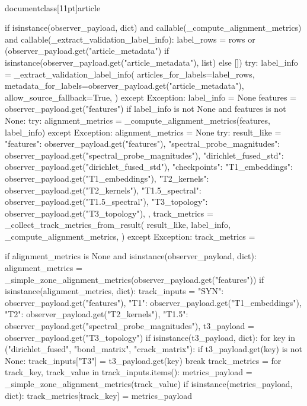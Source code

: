 \\documentclass[11pt]{article}
\begin{document}
\begin{CodeBlock}
    if isinstance(observer_payload, dict) and callable(_compute_alignment_metrics) and callable(_extract_validation_label_info):
        label_rows = rows or (observer_payload.get("article_metadata") if isinstance(observer_payload.get("article_metadata"), list) else [])
        try:
            label_info = _extract_validation_label_info(
                articles_for_labels=label_rows,
                metadata_for_labels=observer_payload.get("article_metadata"),
                allow_source_fallback=True,
            )
        except Exception:
            label_info = None
        features = observer_payload.get("features")
        if label_info is not None and features is not None:
            try:
                alignment_metrics = _compute_alignment_metrics(features, label_info)
            except Exception:
                alignment_metrics = None
            try:
                result_like = {
                    "features": observer_payload.get("features"),
                    "spectral_probe_magnitudes": observer_payload.get("spectral_probe_magnitudes"),
                    "dirichlet_fused_std": observer_payload.get("dirichlet_fused_std"),
                    "checkpoints": {
                        "T1_embeddings": observer_payload.get("T1_embeddings"),
                        "T2_kernels": observer_payload.get("T2_kernels"),
                        "T1.5_spectral": observer_payload.get("T1.5_spectral"),
                        "T3_topology": observer_payload.get("T3_topology"),
                    },
                }
                track_metrics = _collect_track_metrics_from_result(
                    result_like,
                    label_info,
                    _compute_alignment_metrics,
                )
            except Exception:
                track_metrics = {}

    if alignment_metrics is None and isinstance(observer_payload, dict):
        alignment_metrics = _simple_zone_alignment_metrics(observer_payload.get("features"))
        if isinstance(alignment_metrics, dict):
            track_inputs = {
                "SYN": observer_payload.get("features"),
                "T1": observer_payload.get("T1_embeddings"),
                "T2": observer_payload.get("T2_kernels"),
                "T1.5": observer_payload.get("spectral_probe_magnitudes"),
            }
            t3_payload = observer_payload.get("T3_topology")
            if isinstance(t3_payload, dict):
                for key in ("dirichlet_fused", "bond_matrix", "crack_matrix"):
                    if t3_payload.get(key) is not None:
                        track_inputs["T3"] = t3_payload.get(key)
                        break
            track_metrics = {}
            for track_key, track_value in track_inputs.items():
                metrics_payload = _simple_zone_alignment_metrics(track_value)
                if isinstance(metrics_payload, dict):
                    track_metrics[track_key] = metrics_payload


\end{CodeBlock}
\end{document}
